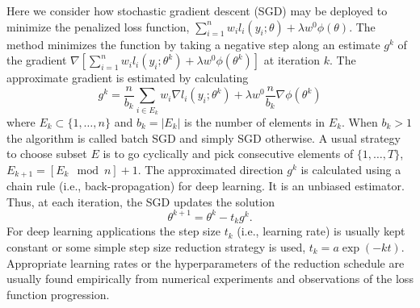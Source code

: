 \documentclass[12pt]{TD-CJS}
\begin{document}
\begin{appendix}\label{SGD}
Here we consider how stochastic gradient descent (SGD) may be deployed to
  minimize the penalized loss function, $\sum_{i=1}^n w_i l_i(y_i; \theta) + \lambda w^{0} \phi(\theta)$. The method minimizes the function by taking a negative step along an estimate $g^k$ of the gradient $\nabla\left[\sum_{i=1}^n w_i l_i(y_i; \theta^k) + \lambda w^{0} \phi(\theta^k)\right] $ at iteration $k$. 
The approximate gradient is estimated by calculating 
\[
g^k = \frac{n}{b_k} \sum_{i \in E_k} w_i\nabla  l_i(y_i; \theta^k) +  \lambda w^{0} \frac{n}{b_k}\nabla \phi(\theta^k)
\]
where $E_k \subset \{1,\ldots,n \}$ and $b_k = |E_k|$ is the number of elements in $E_k$. When $b_k >1$ the algorithm is called batch SGD and simply SGD otherwise. A usual strategy to choose subset $E$ is to go cyclically and pick consecutive elements of $\{1,\ldots,T \}$, $E_{k+1} = [E_k \mod n]+1$. The approximated direction  $g^k$ is calculated using a 
chain rule (i.e., back-propagation) for deep learning. It  is an unbiased estimator. Thus, at each iteration, the SGD updates the solution
\[
\theta^{k+1} = \theta^k - t_k g^k.
\]
For deep learning applications the step size $t_k$ (i.e., learning rate) is usually kept constant or some simple step size reduction strategy is used, $t_k = a\exp(-kt)$. Appropriate learning rates or the hyperparameters of the reduction schedule  are usually found empirically from numerical experiments and observations of the loss function progression. \\
\end{appendix}
\end{document}
